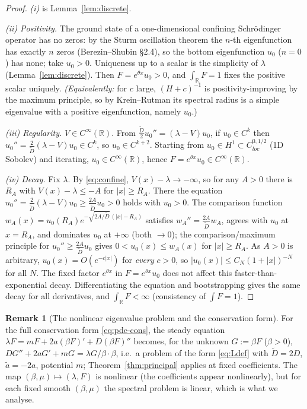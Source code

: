 \documentclass{amsart}
\theoremstyle{definition}
\newtheorem{remark}{Remark}
\newcommand{\R}{\mathbb{R}}
\begin{document}
\begin{proof}
\emph{(i)} is Lemma~\ref{lem:discrete}.

\emph{(ii) Positivity.} The ground state of a one-dimensional confining Schr\"odinger operator
has no zeros: by the Sturm oscillation theorem the $n$-th eigenfunction has exactly $n$ zeros
(Berezin--Shubin \S2.4), so the bottom eigenfunction $u_0$ ($n=0$) has none; take $u_0>0$.
Uniqueness up to a scalar is the simplicity of $\lambda$ (Lemma~\ref{lem:discrete}). Then
$F=e^{\theta x}u_0>0$, and $\int_\R F=1$ fixes the positive scalar uniquely.
\emph{(Equivalently:} for $c$ large, $(H+c)^{-1}$ is positivity-improving by the maximum
principle, so by Krein--Rutman its spectral radius is a simple eigenvalue with a positive
eigenfunction, namely $u_0$.)

\emph{(iii) Regularity.} $V\in C^\infty(\R)$. From $\frac{\widetilde D}{2}u_0''=(\lambda-V)u_0$,
if $u_0\in C^k$ then $u_0''=\frac{2}{\widetilde D}(\lambda-V)u_0\in C^k$, so $u_0\in C^{k+2}$.
Starting from $u_0\in H^1\subset C^{0,1/2}_{loc}$ (1D Sobolev) and iterating, $u_0\in C^\infty(\R)$,
hence $F=e^{\theta x}u_0\in C^\infty(\R)$.

\emph{(iv) Decay.} Fix $\lambda$. By \eqref{eq:confine}, $V(x)-\lambda\to-\infty$, so for any
$A>0$ there is $R_A$ with $V(x)-\lambda\le -A$ for $|x|\ge R_A$. There the equation
$u_0''=\frac{2}{\widetilde D}(\lambda-V)u_0\ge\frac{2A}{\widetilde D}u_0>0$ holds with $u_0>0$.
The comparison function $w_A(x)=u_0(R_A)e^{-\sqrt{2A/\widetilde D}\,(|x|-R_A)}$ satisfies
$w_A''=\frac{2A}{\widetilde D}w_A$, agrees with $u_0$ at $x=R_A$, and dominates $u_0$ at
$+\infty$ (both $\to0$); the comparison/maximum principle for $u_0''\ge\frac{2A}{\widetilde D}u_0$
gives $0<u_0(x)\le w_A(x)$ for $|x|\ge R_A$. As $A>0$ is arbitrary,
$u_0(x)=O(e^{-c|x|})$ for \emph{every} $c>0$, so $|u_0(x)|\le C_N(1+|x|)^{-N}$ for all $N$.
The fixed factor $e^{\theta x}$ in $F=e^{\theta x}u_0$ does not affect this faster-than-exponential
decay. Differentiating the equation and bootstrapping gives the same decay for all
derivatives, and $\int_\R F<\infty$ (consistency of $\int F=1$).
\end{proof}

\begin{remark}[The nonlinear eigenvalue problem and the conservation form]
For the full conservation form \eqref{eq:pde-cons}, the steady equation
$\lambda F=mF+2a(\beta F)'+D(\beta F)''$ becomes, for the unknown $G:=\beta F$ ($\beta>0$),
$D G''+2aG'+mG=\lambda G/\beta\cdot\beta$, i.e.\ a problem of the form \eqref{eq:Ldef} with
$\widetilde D=2D$, $\widetilde a=-2a$, potential $m$; Theorem~\ref{thm:principal} applies at
fixed coefficients. The map $(\beta,\mu)\mapsto(\lambda,F)$ is nonlinear (the coefficients
appear nonlinearly), but for each fixed smooth $(\beta,\mu)$ the spectral problem is linear,
which is what we analyse.
\end{remark}
\end{document}
